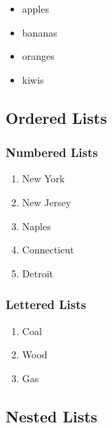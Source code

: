 \documentclass[
]{article}
\providecommand{\tightlist}{%
  \setlength{\itemsep}{0pt}\setlength{\parskip}{0pt}}
\begin{document}
\begin{itemize}
\tightlist
\item
  apples
\item
  bananas
\item
  oranges
\item
  kiwis
\end{itemize}

\hypertarget{ordered-lists}{%
\subsection{Ordered Lists}\label{ordered-lists}}

\hypertarget{numbered-lists}{%
\subsubsection{Numbered Lists}\label{numbered-lists}}

\begin{enumerate}
\def\labelenumi{\arabic{enumi}.}
\tightlist
\item
  New York
\item
  New Jersey
\item
  Naples
\item
  Connecticut
\item
  Detroit
\end{enumerate}

\hypertarget{lettered-lists}{%
\subsubsection{Lettered Lists}\label{lettered-lists}}

\begin{enumerate}
\def\labelenumi{\alph{enumi}.}
\tightlist
\item
  Coal
\item
  Wood
\item
  Gas
\end{enumerate}

\hypertarget{nested-lists}{%
\subsection{Nested Lists}\label{nested-lists}}
\end{document}

